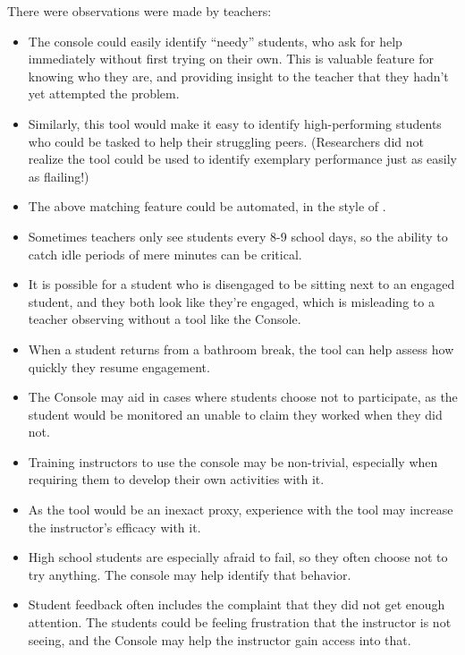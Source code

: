 There were observations were made by teachers: 
\begin{itemize}
\item The console could easily identify ``needy'' students, who ask for help immediately without first trying on their own. This is valuable feature for knowing who they are, and providing insight to the teacher that they hadn't yet attempted the problem. %
\item Similarly, this tool would make it easy to identify high-performing students who could be tasked to help their struggling peers. (Researchers did not realize the tool could be used to identify exemplary performance just as easily as flailing!) 
\item The above matching feature could be automated, in the style of \citet{Diana:2017:IDR:3027385.3027441}.
\item Sometimes teachers only see students every 8-9 school days, so the ability to catch idle periods of mere minutes can be critical. 
\item It is possible for a student who is disengaged to be sitting next to an engaged student, and they both look like they're engaged, which is misleading to a teacher observing without a tool like the Console.
\item When a student returns from a bathroom break, the tool can help assess how quickly they resume engagement.
\item The Console may aid in cases where students choose not to participate, as the student would be monitored an unable to claim they worked when they did not.
\item Training instructors to use the console may be non-trivial, especially when requiring them to develop their own activities with it. 
\item As the tool would be an inexact proxy, experience with the tool may increase the instructor's efficacy with it.
\item High school students are especially afraid to fail, so they often choose not to try anything. The console may help identify that behavior.
\item Student feedback often includes the complaint that they did not get enough attention. The students could be feeling frustration that the instructor is not seeing, and the Console may help the instructor gain access into that.
\end{itemize}

